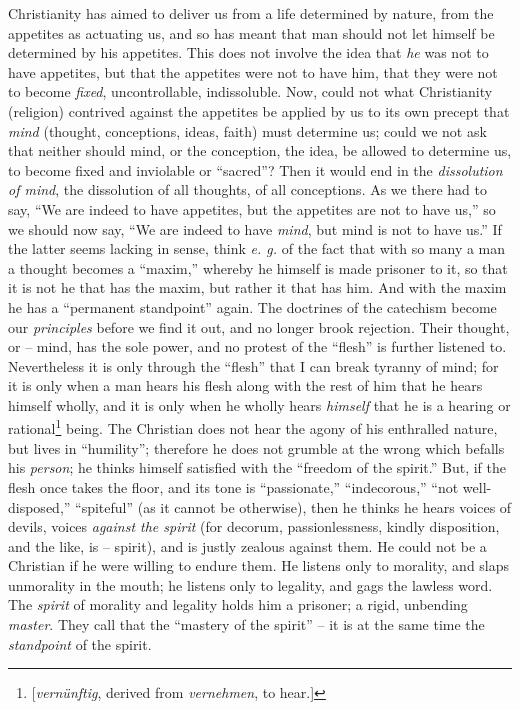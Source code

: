 \documentclass[12pt,a4paper]{book}
\begin{document}
Christianity has aimed to deliver us from a life determined by nature, from 
the appetites as actuating us, and so has meant that man should not let 
himself be determined by his appetites. This does not involve the idea that 
\textit{he} was not to have appetites, but that the appetites were not to have 
him, that they were not to become \textit{fixed}, uncontrollable, 
indissoluble. Now, could not what Christianity (religion) contrived against 
the appetites be applied by us to its own precept that \textit{mind} (thought, 
conceptions, ideas, faith) must determine us; could we not ask that neither 
should mind, or the conception, the idea, be allowed to determine us, to 
become fixed and inviolable or ``sacred''? Then it would end in the 
\textit{dissolution of mind}, the dissolution of all thoughts, of all 
conceptions. As we there had to say, ``We are indeed to have appetites, but 
the appetites are not to have us,'' so we should now say, ``We are indeed to 
have \textit{mind}, but mind is not to have us.'' If the latter seems lacking 
in sense, think \textit{e. g.} of the fact that with so many a man a thought 
becomes a ``maxim,'' whereby he himself is made prisoner to it, so that it 
is not he that has the maxim, but rather it that has him. And with the maxim 
he has a ``permanent standpoint'' again. The doctrines of the catechism 
become our \textit{principles} before we find it out, and no longer brook 
rejection. Their thought, or -- mind, has the sole power, and no protest of 
the ``flesh'' is further listened to. Nevertheless it is only through the 
``flesh'' that I can break tyranny of mind; for it is only when a man hears 
his flesh along with the rest of him that he hears himself wholly, and it is 
only when he wholly hears \textit{himself} that he is a hearing or 
rational\footnote{[\textit{vern\"unftig}, derived from \textit{vernehmen}, to 
hear.]} being. The Christian does not hear the agony of his enthralled nature, 
but lives in ``humility''; therefore he does not grumble at the wrong which 
befalls his \textit{person}; he thinks himself satisfied with the ``freedom 
of the spirit.'' But, if the flesh once takes the floor, and its tone is 
``passionate,'' ``indecorous,'' ``not well-disposed,'' ``spiteful'' 
(as it cannot be otherwise), then he thinks he hears voices of devils, voices 
\textit{against the spirit} (for decorum, passionlessness, kindly disposition, 
and the like, is -- spirit), and is justly zealous against them. He could not 
be a Christian if he were willing to endure them. He listens only to morality, 
and slaps unmorality in the mouth; he listens only to legality, and gags the 
lawless word. The \textit{spirit} of morality and legality holds him a 
prisoner; a rigid, unbending \textit{master}. They call that the ``mastery of 
the spirit'' -- it is at the same time the \textit{standpoint} of the spirit.
\end{document}
